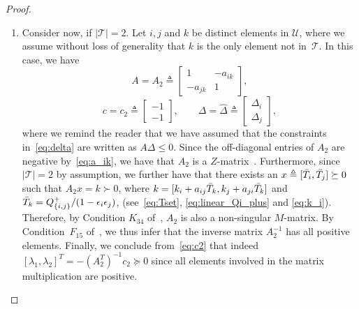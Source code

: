 \begin{proof}
\begin{enumerate}
	\item Consider now, if $|\mathcal{T}| = 2$.  Let $i, j$  and $k$ be distinct elements in $\mathcal{U}$, where we assume without loss of generality that $k$ is the only element not in~$\mathcal{T}$.
	In this case, we have
	\begin{equation}
		A =  A_2 \triangleq\begin{bmatrix}
			       	1 & -a_{ik}           \\
				-a_{jk} & 1  
			\end{bmatrix},
	\end{equation}
	\begin{equation}
	\label{eq:c2}
		c = c_2 \triangleq \begin{bmatrix}
				-1 \\
				-1 
			\end{bmatrix}, \qquad
		\Delta = \hat{\Delta} \triangleq \begin{bmatrix}
				\Delta_i \\
				\Delta_j 
			\end{bmatrix},
	\end{equation}
	where we remind the reader that we have assumed that the constraints in~\eqref{eq:delta} are written as $A\Delta \leq 0$.  
	Since the off-diagonal entries of $A_2$ are negative by~\eqref{eq:a_ik}, we have that $A_2$ is a $Z$-matrix~\cite{P77}.  Furthermore, since $|\mathcal{T}| = 2$ by assumption, we further have that there exists an $x \triangleq [\bar{T}_{i}, \bar{T}_{j}] \succeq 0$ such that $A_2x = k \succ 0$, where $k = [k_i + a_{ij}\bar{T}_{k}, k_j + a_{ji}\bar{T}_{k}]$ and $\bar{T}_{k} = Q_{\{i, j\}}^{+}/(1 - \epsilon_i\epsilon_j)$, (see~\eqref{eq:Tset}, \eqref{eq:linear_Qi_plus} and \eqref{eq:k_i}).  Therefore, by Condition $K_{34}$ of~\cite{P77}, $A_2$ is also a non-singular $M$-matrix.  
	By Condition~$F_{15}$ of~\cite{P77}, we thus infer that the inverse matrix $A_{2}^{-1}$ has all positive elements.  Finally, we conclude from~\eqref{eq:c2} that indeed $[\lambda_1, \lambda_2]^T = -(A_2^T)^{-1} c_2 \succeq 0$ since all elements involved in the matrix multiplication are positive.


\end{enumerate}
\end{proof}

